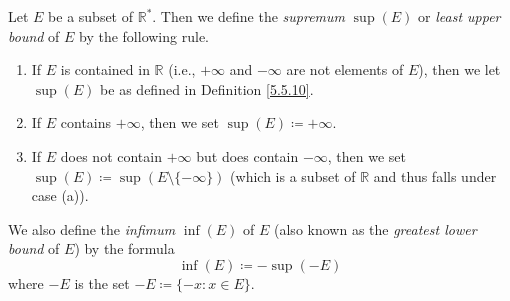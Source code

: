 \begin{definition}\label{6.2.6}
Let \(E\) be a subset of \(\mathds{R}^*\).
Then we define the \emph{supremum} \(\sup(E)\) or \emph{least upper bound} of \(E\) by the following rule.
\begin{enumerate}
    \item If \(E\) is contained in \(\mathds{R}\) (i.e., \(+\infty\) and \(-\infty\) are not elements of \(E\)), then we let \(\sup(E)\) be as defined in Definition \ref{5.5.10}.
    \item If \(E\) contains \(+\infty\), then we set \(\sup(E) \coloneqq +\infty\).
    \item If \(E\) does not contain \(+\infty\) but does contain \(-\infty\), then we set \(\sup(E) \coloneqq \sup(E \setminus \{-\infty\})\)
    (which is a subset of \(\mathds{R}\) and thus falls under case (a)).
\end{enumerate}
We also define the \emph{infimum} \(\inf(E)\) of \(E\) (also known as the \emph{greatest lower bound} of \(E\)) by the formula
\[
    \inf(E) \coloneqq -\sup(-E)
\]
where \(-E\) is the set \(-E \coloneqq \{-x : x \in E\}\).
\end{definition}

